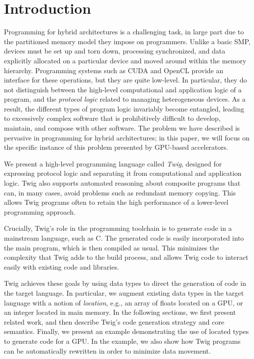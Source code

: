 
\section{Introduction}

Programming for hybrid architectures is a challenging task, in
large part due to the partitioned memory model they impose on
programmers. Unlike a basic SMP, devices must be set up and torn
down, processing synchronized, and data explicitly allocated on a
particular device and moved around within the memory hierarchy.
Programming systems such as CUDA\cite{cuda} and
OpenCL\cite{opencl} provide an interface for these operations, but
they are quite low-level. In particular, they do not distinguish
between the high-level computational and application logic of a
program, and the \emph{protocol logic} related to managing
heterogeneous devices. As a result, the different types of program
logic invariably become entangled, leading to excessively complex
software that is prohibitively difficult to develop, maintain, and
compose with other software. The problem we have described is
pervasive in programming for hybrid architectures; in this paper,
we will focus on the specific instance of this problem presented
by GPU-based accelerators.

We present a high-level programming language called \emph{Twig},
designed for expressing protocol logic and separating it from
computational and application logic. Twig also supports automated
reasoning about composite programs that can, in many cases, avoid
problems such as redundant memory copying. This allows Twig
programs often to retain the high performance of a lower-level
programming approach.

Crucially, Twig's role in the programming toolchain is to generate
code in a mainstream language, such as C. The generated code is
easily incorporated into the main program, which is then compiled
as usual. This minimizes the complexity that Twig adds to the
build process, and allows Twig code to interact easily with
existing code and libraries.

Twig achieves these goals by using data types to direct the
generation of code in the target language. In particular, we
augment existing data types in the target language with a notion
of \emph{location}, e.g., an array of floats located on a GPU, or
an integer located in main memory. In the following sections, we
first present related work, and then describe Twig's code
generation strategy and core semantics. Finally, we present an
example demonstrating the use of located types to generate code
for a GPU. In the example, we also show how Twig programs can be
automatically rewritten in order to minimize data movement.
